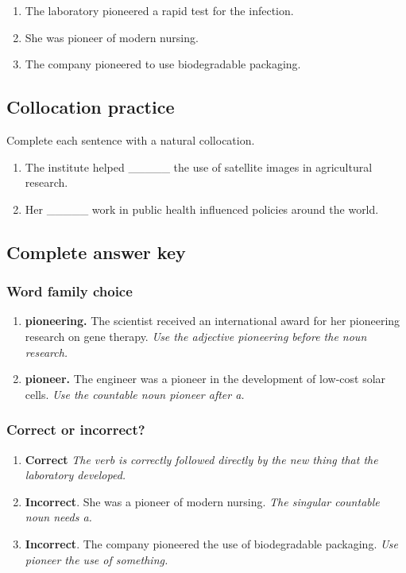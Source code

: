 \documentclass[11pt]{article}
\begin{document}
\begin{enumerate}
  \item The laboratory pioneered a rapid test for the infection.
  \item She was pioneer of modern nursing.
  \item The company pioneered to use biodegradable packaging.
\end{enumerate}

\subsection{Collocation practice}
Complete each sentence with a natural collocation.

\begin{enumerate}
  \item The institute helped \_\_\_\_\_ the use of satellite images in agricultural research.
  \item Her \_\_\_\_\_ work in public health influenced policies around the world.
\end{enumerate}

\subsection{Complete answer key}
\subsubsection{Word family choice}
\begin{enumerate}
  \item \textbf{pioneering.} The scientist received an international award for her pioneering research on gene therapy. \emph{Use the adjective pioneering before the noun research.}
  \item \textbf{pioneer.} The engineer was a pioneer in the development of low-cost solar cells. \emph{Use the countable noun pioneer after a.}
\end{enumerate}

\subsubsection{Correct or incorrect?}
\begin{enumerate}
  \item \textbf{Correct} \emph{The verb is correctly followed directly by the new thing that the laboratory developed.}
  \item \textbf{Incorrect}. She was a pioneer of modern nursing. \emph{The singular countable noun needs a.}
  \item \textbf{Incorrect}. The company pioneered the use of biodegradable packaging. \emph{Use pioneer the use of something.}
\end{enumerate}
\end{document}
